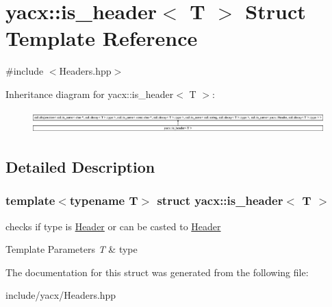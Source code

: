 \hypertarget{structyacx_1_1is__header}{}\section{yacx\+:\+:is\+\_\+header$<$ T $>$ Struct Template Reference}
\label{structyacx_1_1is__header}


{\ttfamily \#include $<$Headers.\+hpp$>$}

Inheritance diagram for yacx\+:\+:is\+\_\+header$<$ T $>$\+:\begin{figure}[H]
\begin{center}
\leavevmode
\includegraphics[height=0.886076cm]{structyacx_1_1is__header}
\end{center}
\end{figure}


\subsection{Detailed Description}
\subsubsection*{template$<$typename T$>$\newline
struct yacx\+::is\+\_\+header$<$ T $>$}

checks if type is \hyperlink{classyacx_1_1_header}{Header} or can be casted to \hyperlink{classyacx_1_1_header}{Header} 
\begin{DoxyTemplParams}{Template Parameters}
{\em T} & type \\
\hline
\end{DoxyTemplParams}


The documentation for this struct was generated from the following file\+:\begin{DoxyCompactItemize}
\item 
include/yacx/Headers.\+hpp\end{DoxyCompactItemize}
